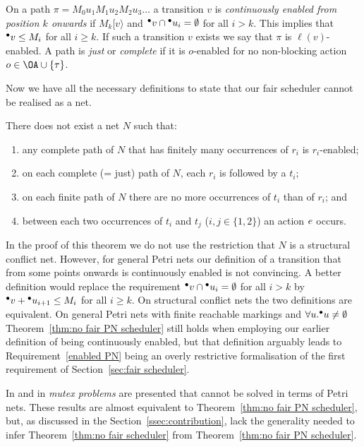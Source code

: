 \documentclass[smallcondensed]{svjour3}
\newcommand{\Thm}[1]{Theorem~\ref{thm:#1}}
\newcommand{\Sect}[1]{Section~\ref{sec:#1}}
\newcommand{\SSect}[1]{Section~\ref{ssec:#1}}
\begin{document}
On a path $\pi = M_0 u_1 M_1 u_2 M_2 u_3 \dots$ a transition $v$ is \emph{continuously enabled from position $k$ onwards} if
$M_k [v\rangle$ and $\precond{v}\cap\precond{u_i}=\emptyset$ for all $i \mathbin > k$.
This implies that $\precond{v}\leq M_i$ for all $i \geq k$.
If such a transition $v$ exists we say that $\pi$ is $\ell(v)$-enabled.
A path is \emph{just} or \emph{complete} if it is $o$-enabled for no non-blocking action $o\in\OA\cup\{\tau\}$.

Now we have all the necessary definitions to state that our fair scheduler cannot be realised as a net.

\begin{theorem}\rm\label{thm:no fair PN scheduler}
There does not exist a net $N$ such that:
\vspace{-1ex}
\begin{enumerate}
\item any complete path of $N$ that has finitely many occurrences of $r_i$ is $r_i$-enabled;\label{enabled PN}
\item on each complete (= just) path of $N$, each $r_i$ is followed by a $t_i$;\label{fair PN}
\item on each finite path of $N$ there are no more occurrences of $t_i$ than of $r_i$;\label{patient PN} and
\item between each two occurrences of $t_i$ and $t_j$ ($i,j\in\{1,2\}$) an action $e$ occurs.\label{coordinated PN}
\end{enumerate}
\end{theorem}
In the proof of this theorem we do not use the restriction that $N$ is a structural conflict net.
However, for general Petri nets our definition of a transition that from some points onwards is
continuously enabled is not convincing. A better definition would replace the requirement 
$\precond{v}\cap\precond{u_i}=\emptyset$ for all $i>k$ by
$\precond{v}+\precond{u_{i+1}} \leq M_i$ for all $i\geq k$.
On structural conflict nets the two definitions are equivalent.
On general
Petri nets with finite reachable markings and $\forall u. \precond{u}\neq\emptyset$ \Thm{no fair PN scheduler}
still holds when employing our earlier definition of being continuously enabled, but that definition
arguably leads to Requirement~\ref{enabled PN} being an overly restrictive formalisation of the first requirement
of \Sect{fair scheduler}.

In \cite{Vogler02} and in \cite{KW97} \emph{mutex problems} are presented that cannot be solved
in terms of Petri nets. These results are almost equivalent to \Thm{no fair PN scheduler}, but,
as discussed in the \SSect{contribution}, lack the generality needed to infer \Thm{no fair scheduler} from \Thm{no fair PN scheduler}.
\end{document}
